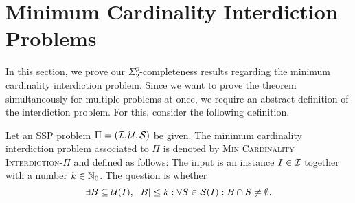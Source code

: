 \section{Minimum Cardinality Interdiction Problems}

In this section, we prove our $\Sigma^p_2$-completeness results regarding the minimum cardinality interdiction problem. 
Since we want to prove the theorem simultaneously for multiple problems at once, we require an abstract definition of the interdiction problem.
For this, consider the following definition.

\begin{definition}
\label{def:min-card-interdiction-pi}
    Let an SSP problem $\Pi = (\mathcal{I}, \mathcal{U}, \mathcal{S})$ be given.
    The minimum cardinality interdiction problem associated to $\Pi$ is denoted by \textsc{Min Cardinality Interdiction-$\Pi$} and defined as follows:
    The input is an instance $I \in \mathcal{I}$ together with a number $k \in \mathbb{N}_0$.
    The question is whether
    \[
        \exists B \subseteq \mathcal{U}(I), \ |B| \leq k : \forall S \in \mathcal{S}(I) : B \cap S \neq \emptyset.
    \]
\end{definition}

